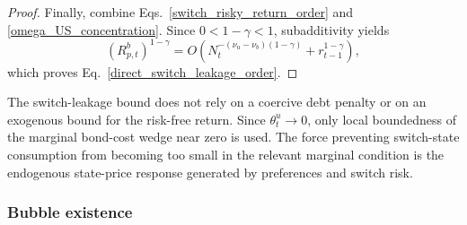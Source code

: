 \documentclass{article}
\def\green#1{#1}%
\begin{document}
\begin{proof}
\green{Finally}, \green{combine Eqs}.~\green{\eqref{switch_risky_return_order} and \eqref{omega_US_concentration}}.  \green{Since} $\green{0<1-\gamma<1}$, \green{subadditivity yields}
\[
(\green{R}_{\green{p},\green{t}}^\green{b})^{\green{1-\gamma}}
\green{=}
\green{O}\left(
\green{N}_\green{t}^{\green{-}(\green{\nu}_\green{u-\nu}_\green{b})(\green{1-\gamma})}
\green{+r}_{\green{t-1}}^{\green{1-\gamma}}
\right),
\]
\green{which proves Eq}.~\green{\eqref{direct_switch_leakage_order}}.
\end{proof}

\green{The switch-leakage bound does not rely on a coercive debt penalty or on an exogenous bound for} the \green{risk-free} return.  \green{Since} $\green{\theta}_t^u\green{\to0}$, \green{only local boundedness of the marginal bond-cost wedge near zero is used}.  \green{The force preventing switch-state consumption} from \green{becoming too small} in the \green{relevant marginal condition is the endogenous state-price response generated by preferences and switch risk}.

\subsubsection{Bubble existence}
\end{document}
